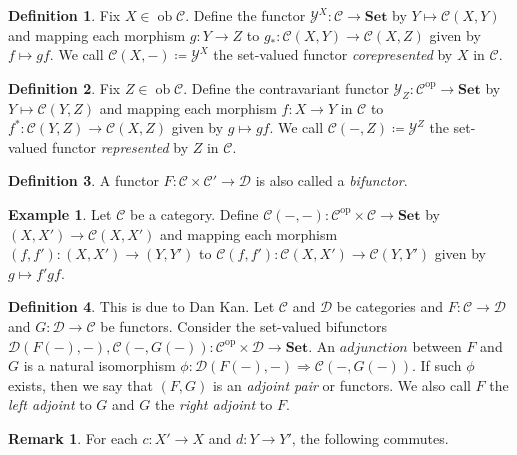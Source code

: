 \documentclass[10pt,letterpaper,cm]{nupset}
\theoremstyle{definition}
\newtheorem*{definition}{Definition}
\newtheorem{exmp}{Example}
\newtheorem{remark}{Remark}
\newcommand{\1}{\mathbf{1}}
\renewcommand{\c}{\mathscr{C}}
\renewcommand{\d}{\mathscr{D}}
\newcommand{\y}{\mathscr{Y}}
\newcommand{\0}{\vec 0}
\DeclareMathOperator{\op}{op}
\DeclareMathOperator{\ob}{ob}
\begin{document}
\begin{definition}
Fix $X \in \ob \c$. Define the functor $\y^X : \c \to \mathbf{Set}$ by $Y \mapsto \c(X, Y)$  and mapping each morphism $g: Y \to Z$ to $g_{\ast} : \c(X, Y) \to \c(X, Z)$ given by $f \mapsto gf$. We call $\c(X, -)\coloneqq\y^X$ the set-valued functor \textit{corepresented} by $X$ in $\c$.
\end{definition}

\begin{definition}
Fix $Z \in \ob \c$. Define the contravariant functor $\y_Z: \c^{\op} \to \mathbf{Set}$ by $Y \mapsto \c(Y, Z)$ and mapping each morphism $f: X \to Y$ in $\c$ to $f^{\ast} : \c(Y, Z) \to \c(X, Z)$ given by $g\mapsto gf$. We call $\c(-, Z)\coloneqq \y^Z$ the set-valued functor \textit{represented} by $Z$ in $\c$.
\end{definition}

\begin{definition}
A functor $F: \c \times \c' \to \d$ is also called a \textit{bifunctor}.
\end{definition}

\begin{exmp}
Let $\c$ be a category. Define $\c(-, -): \c^{\op} \times \c \to \mathbf{Set}$ by $(X, X') \to \c(X, X')$ and mapping each morphism $(f, f') : (X, X') \to (Y, Y')$ to $\c(f, f') : \c(X, X') \to \c(Y, Y')$ given by $g \mapsto f'gf$.
\end{exmp}

\begin{definition}
This is due to Dan Kan. Let $\c$ and $\d$ be categories and $F : \c \to \d$ and $G: \d \to \c$ be functors. Consider the set-valued bifunctors $ \d(F(-), -), \c(-, G(-)): \c^{\op} \times \d \to \mathbf{Set}$. An $\textit{adjunction}$ between $F$ and $G$ is a natural isomorphism $\phi : \d(F(-), -) \Rightarrow \c(-, G(-))$. If such $\phi$ exists, then we say that $(F, G)$ is an \textit{adjoint pair} or functors. We also call $F$ the \textit{left adjoint} to $G$ and $G$ the \textit{right adjoint} to $F$. 

\begin{remark}
For each $c: X' \to X$ and $d: Y \to Y'$, the following commutes.

\begin{center}
\end{center}

\end{remark}

\end{definition}
\end{document}
